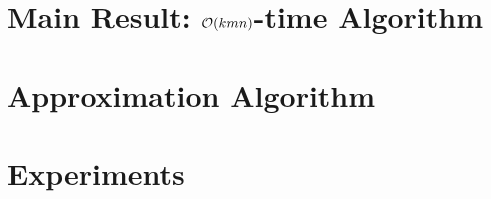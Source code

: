 \section{Main Result: \texorpdfstring{$\mathcal{O}(kmn)$}{Okm}-time Algorithm}
\label{dtw:sec:block}

\section{Approximation Algorithm}
\label{dtw:sec:approx}

\section{Experiments}\label{dtw:sec:experiments}


\BiblatexSplitbibDefernumbersWarningOff

\backmatter
\printbibliography[segment=\therefsegment,heading=subbibintoc]